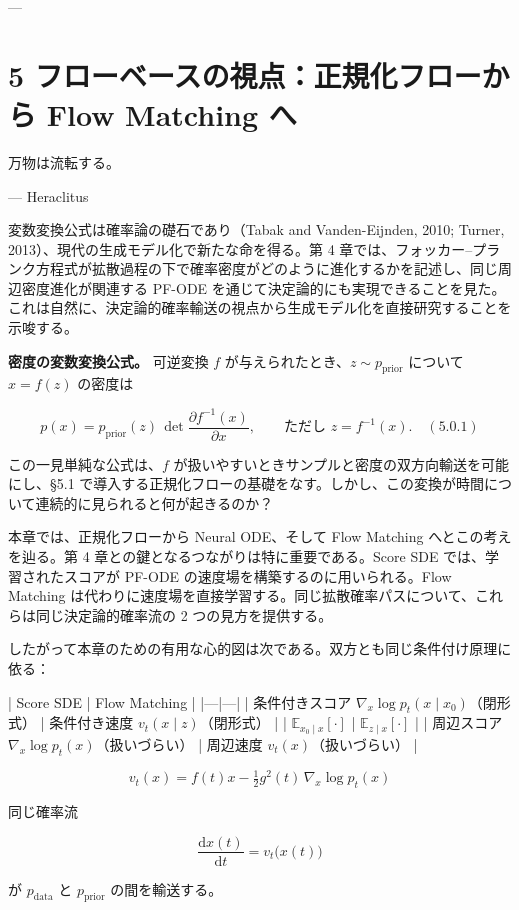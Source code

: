 ---

\section*{5 フローベースの視点：正規化フローから Flow Matching へ}


\begin{propositionbox}[注意]
万物は流転する。

— Heraclitus
\end{propositionbox}


変数変換公式は確率論の礎石であり（Tabak and Vanden-Eijnden, 2010; Turner, 2013）、現代の生成モデル化で新たな命を得る。第 4 章では、フォッカー–プランク方程式が拡散過程の下で確率密度がどのように進化するかを記述し、同じ周辺密度進化が関連する PF-ODE を通じて決定論的にも実現できることを見た。これは自然に、決定論的確率輸送の視点から生成モデル化を直接研究することを示唆する。

\textbf{密度の変数変換公式。} 可逆変換 $f$ が与えられたとき、$z\sim p_{\mathrm{prior}}$ について $x=f(z)$ の密度は

\[
p(x)=p_{\mathrm{prior}}(z)\,\det\frac{\partial f^{-1}(x)}{\partial x},
\qquad\text{ただし }z=f^{-1}(x).\quad (5.0.1)
\]


この一見単純な公式は、$f$ が扱いやすいときサンプルと密度の双方向輸送を可能にし、§5.1 で導入する正規化フローの基礎をなす。しかし、この変換が時間について連続的に見られると何が起きるのか？

本章では、正規化フローから Neural ODE、そして Flow Matching へとこの考えを辿る。第 4 章との鍵となるつながりは特に重要である。Score SDE では、学習されたスコアが PF-ODE の速度場を構築するのに用いられる。Flow Matching は代わりに速度場を直接学習する。同じ拡散確率パスについて、これらは同じ決定論的確率流の 2 つの見方を提供する。

したがって本章のための有用な心的図は次である。双方とも同じ条件付け原理に依る：

| Score SDE | Flow Matching |
|---|---|
| 条件付きスコア $\nabla_x\log p_t(x\mid x_0)$（閉形式） | 条件付き速度 $v_t(x\mid z)$（閉形式） |
| $\mathbb{E}_{x_0\mid x}[\cdot]$ | $\mathbb{E}_{z\mid x}[\cdot]$ |
| 周辺スコア $\nabla_x\log p_t(x)$（扱いづらい） | 周辺速度 $v_t(x)$（扱いづらい） |

\[
v_t(x)=f(t)x-\tfrac{1}{2}g^2(t)\,\nabla_x\log p_t(x)
\]


同じ確率流

\[
\frac{\mathrm{d}x(t)}{\mathrm{d}t}=v_t\bigl(x(t)\bigr)
\]


が $p_{\mathrm{data}}$ と $p_{\mathrm{prior}}$ の間を輸送する。

